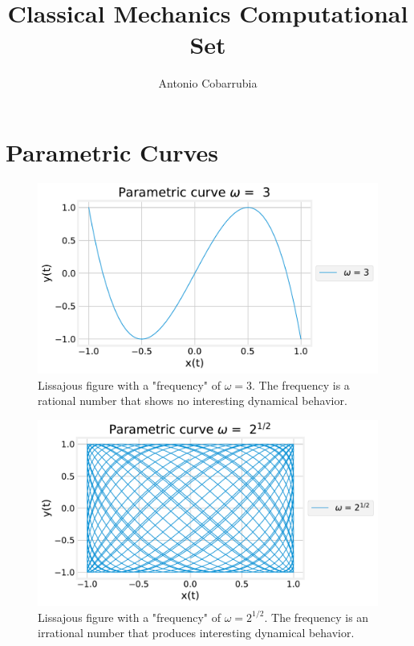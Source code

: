 \documentclass[11pt]{article}
\title{Classical Mechanics Computational Set}
\author{Antonio Cobarrubia}
\date{}
\begin{document}
\maketitle
\section*{Parametric Curves}
\begin{figure}[H]
    \centering
    \includegraphics[width = 12 cm]{src/parametricw1.pdf}
    \caption{Lissajous figure with a "frequency" of $\omega = 3$. The frequency is a rational number that shows no interesting dynamical behavior.}
    \label{fig:my_label}
\end{figure}
\begin{figure}[H]
    \centering
    \includegraphics[width = 12 cm]{src/parametricw2.pdf}
    \caption{Lissajous figure with a "frequency" of $\omega = 2^{1/2}$. The frequency is an irrational number that produces interesting dynamical behavior.}
    \label{fig:my_label}
\end{figure}
\end{document}

